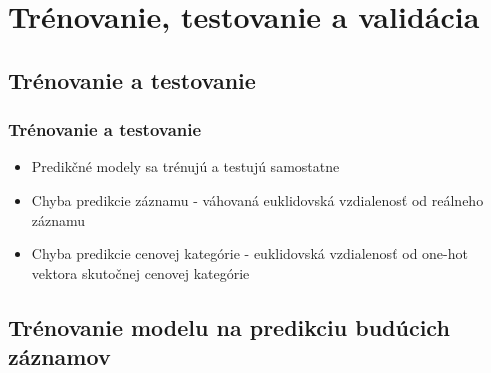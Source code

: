 \documentclass[slovak]{beamer}
\begin{document}
\section{Trénovanie, testovanie a validácia}

\subsection{Trénovanie a testovanie}

\begin{frame}
	\frametitle{Trénovanie a testovanie}
	\begin{itemize}
		\item<1> Predikčné modely sa trénujú a testujú samostatne
		\item<1> Chyba predikcie záznamu - váhovaná euklidovská vzdialenosť od reálneho záznamu
		\item<1> Chyba predikcie cenovej kategórie - euklidovská vzdialenosť od one-hot vektora skutočnej cenovej kategórie
		
	\end{itemize}
\end{frame}

\subsection{Trénovanie modelu na predikciu budúcich záznamov}
\end{document}
